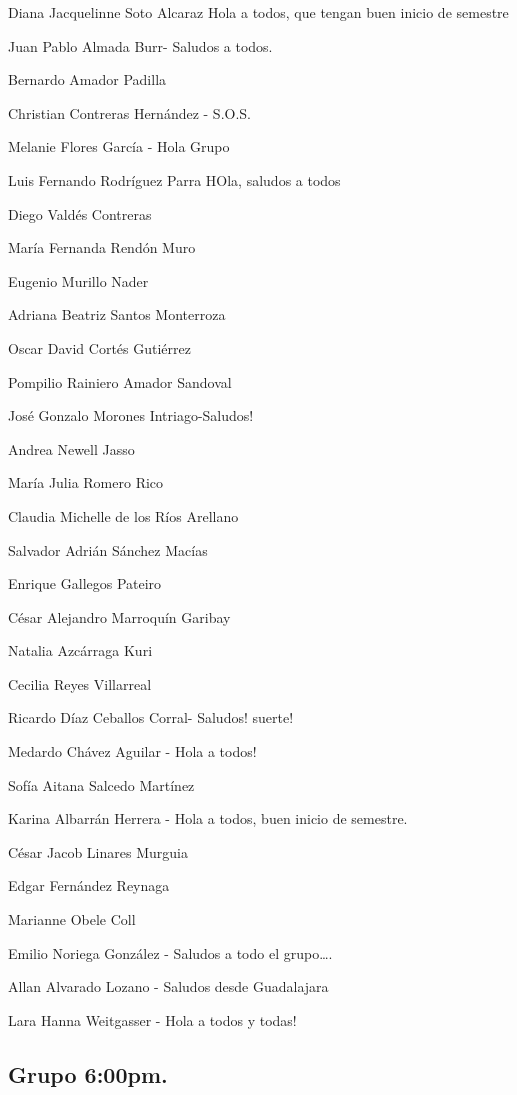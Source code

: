 \documentclass[12pt,halfline,a4paper,]{ouparticle}
\begin{document}
Diana Jacquelinne Soto Alcaraz Hola a todos, que tengan buen inicio de
semestre

Juan Pablo Almada Burr- Saludos a todos.

Bernardo Amador Padilla

Christian Contreras Hernández - S.O.S.

Melanie Flores García - Hola Grupo

Luis Fernando Rodríguez Parra HOla, saludos a todos

Diego Valdés Contreras

María Fernanda Rendón Muro

Eugenio Murillo Nader

Adriana Beatriz Santos Monterroza

Oscar David Cortés Gutiérrez

Pompilio Rainiero Amador Sandoval

José Gonzalo Morones Intriago-Saludos!

Andrea Newell Jasso

María Julia Romero Rico

Claudia Michelle de los Ríos Arellano

Salvador Adrián Sánchez Macías

Enrique Gallegos Pateiro

César Alejandro Marroquín Garibay

Natalia Azcárraga Kuri

Cecilia Reyes Villarreal

Ricardo Díaz Ceballos Corral- Saludos! suerte!

Medardo Chávez Aguilar - Hola a todos!

Sofía Aitana Salcedo Martínez

Karina Albarrán Herrera - Hola a todos, buen inicio de semestre.

César Jacob Linares Murguia

Edgar Fernández Reynaga

Marianne Obele Coll

Emilio Noriega González - Saludos a todo el grupo\ldots.

Allan Alvarado Lozano - Saludos desde Guadalajara

Lara Hanna Weitgasser - Hola a todos y todas!

\hypertarget{grupo-600pm.}{%
\subsection{Grupo 6:00pm.}\label{grupo-600pm.}}
\end{document}
